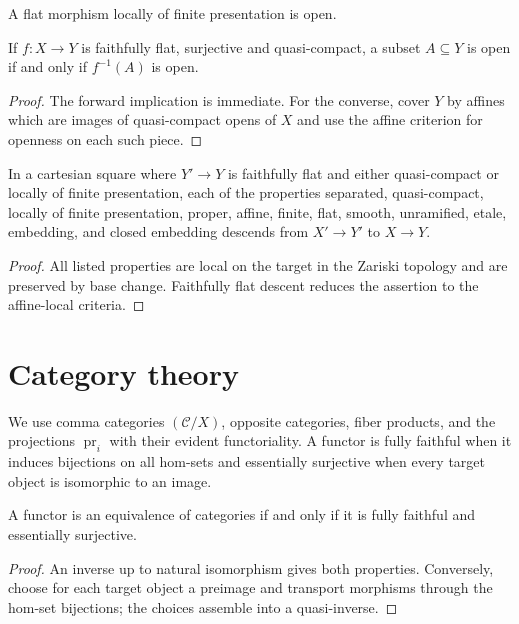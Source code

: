 \begin{proposition}\label{fga-prop-1-12}
A flat morphism locally of finite presentation is open.
\end{proposition}

\begin{proposition}\label{fga-prop-1-13}
If $f:X\to Y$ is faithfully flat, surjective and quasi-compact, a subset
$A\subseteq Y$ is open if and only if $f^{-1}(A)$ is open.
\end{proposition}
\begin{proof}
The forward implication is immediate.  For the converse, cover $Y$ by
affines which are images of quasi-compact opens of $X$ and use the affine
criterion for openness on each such piece.
\end{proof}

\begin{proposition}\label{fga-prop-1-15}
In a cartesian square where $Y'\to Y$ is faithfully flat and either
quasi-compact or locally of finite presentation, each of the properties
separated, quasi-compact, locally of finite presentation, proper, affine,
finite, flat, smooth, unramified, etale, embedding, and closed embedding
descends from $X'\to Y'$ to $X\to Y$.
\end{proposition}
\begin{proof}
All listed properties are local on the target in the Zariski topology and are
preserved by base change.  Faithfully flat descent reduces the assertion to
the affine-local criteria.
\end{proof}

\section{Category theory}

We use comma categories $(\mathcal C/X)$, opposite categories, fiber products,
and the projections $\operatorname{pr}_i$ with their evident functoriality.
A functor is fully faithful when it induces bijections on all hom-sets and
essentially surjective when every target object is isomorphic to an image.

\begin{proposition}\label{fga-prop-1-16}
A functor is an equivalence of categories if and only if it is fully faithful
and essentially surjective.
\end{proposition}
\begin{proof}
An inverse up to natural isomorphism gives both properties.  Conversely, choose
for each target object a preimage and transport morphisms through the hom-set
bijections; the choices assemble into a quasi-inverse.
\end{proof}

